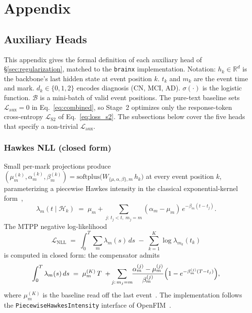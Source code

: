 \documentclass{article}
\newcommand{\Hcal}{\mathcal{H}}
\begin{document}

\appendix

\section{Appendix}
\label{app:appendix}

\subsection{Auxiliary Heads}
\label{app:aux_heads}

This appendix gives the formal definition of each auxiliary head of §\ref{sec:regularization}, matched to the \texttt{brainx} implementation.
Notation: $h_k \in \mathbb{R}^d$ is the backbone's last hidden state at event position $k$. $t_k$ and $m_k$ are the event time and mark. $d_k \in \{0,1,2\}$ encodes diagnosis (CN, MCI, AD). $\sigma(\cdot)$ is the logistic function. $\mathcal{B}$ is a mini-batch of valid event positions.
The pure-text baseline sets $\mathcal{L}_{\text{aux}} = 0$ in Eq.~\eqref{eq:combined}, so Stage~2 optimizes only the response-token cross-entropy $\mathcal{L}_{\text{S2}}$ of Eq.~\eqref{eq:loss_s2}. The subsections below cover the five heads that specify a non-trivial $\mathcal{L}_{\text{aux}}$.

\subsubsection{Hawkes NLL (closed form)}
Small per-mark projections produce $(\mu_m^{(k)}, \alpha_m^{(k)}, \beta_m^{(k)}) = \mathrm{softplus}\bigl(W_{\{\mu,\alpha,\beta\},m}\, h_k\bigr)$ at every event position $k$, parameterizing a piecewise Hawkes intensity in the classical exponential-kernel form~\citep{hawkes1971spectra,shchur2021neural},
\begin{equation}
    \lambda_m(t \mid \Hcal_k)
    \;=\; \mu_m + \!\!\sum_{j:\, t_j < t,\; m_j = m}\!\! (\alpha_m - \mu_m)\, e^{-\beta_m (t - t_j)}.
    \label{eq:hawkes}
\end{equation}
The MTPP negative log-likelihood
\begin{equation}
    \mathcal{L}_{\text{NLL}}
    \;=\; \int_0^{T} \sum_m \lambda_m(s)\, ds \;-\; \sum_{k=1}^{K} \log \lambda_{m_k}(t_k)
    \label{eq:nll}
\end{equation}
is computed in closed form: the compensator admits
\begin{equation}
    \int_0^T \lambda_m(s)\, ds
    \;=\; \mu_m^{(K)}\, T
    \;+\; \!\!\sum_{j:\, m_j = m}\!\!
          \frac{\alpha_m^{(j)} - \mu_m^{(j)}}{\beta_m^{(j)}}
          \Bigl(1 - e^{-\beta_m^{(j)}(T - t_j)}\Bigr),
    \label{eq:hawkes_compensator}
\end{equation}
where $\mu_m^{(K)}$ is the baseline read off the last event~\citep{ogata1981lewis}.
The implementation follows the \texttt{PiecewiseHawkesIntensity} interface of OpenFIM~\citep{berghaus2026incontext}.
\end{document}
